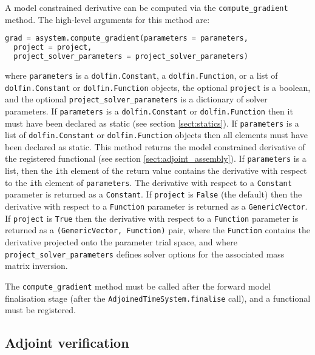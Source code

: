 \documentclass[a4paper]{book}
\begin{document}
A model constrained derivative can be computed via the \verb+compute_gradient+
method. The high-level arguments for this method are:
\begin{lstlisting}[language = python, frame = single, basicstyle=\footnotesize]
grad = asystem.compute_gradient(parameters = parameters,
  project = project,
  project_solver_parameters = project_solver_parameters)
\end{lstlisting}
where \verb+parameters+ is a \verb+dolfin.Constant+, a \verb+dolfin.Function+,
or a list of \verb+dolfin.Constant+ or \verb+dolfin.Function+ objects, the
optional \verb+project+ is a \linebreak boolean, and the optional
\verb+project_solver_parameters+ is a dictionary of solver parameters. If
\verb+parameters+ is a \verb+dolfin.Constant+ or \verb+dolfin.Function+ then it
must have been declared as static (see section \ref{sect:statics}). If
\verb+parameters+ is a list of \verb+dolfin.Constant+ or \verb+dolfin.Function+
objects then all elements must have been declared as static. This method returns
the model constrained derivative of the registered functional (see section
\ref{sect:adjoint_assembly}). If \verb+parameters+ is a list, then the
\verb+i+th element of the return value contains the derivative with respect to
the \verb+i+th element of \verb+parameters+. The derivative with respect to a
\verb+Constant+ parameter is returned as a \verb+Constant+. If \verb+project+ is
\verb+False+ (the default) then the derivative with respect to a \verb+Function+
parameter is returned as a \verb+GenericVector+. If \verb+project+ is
\verb+True+ then the derivative with respect to a \verb+Function+ parameter is
returned as a \verb+(GenericVector, Function)+ pair, where the \verb+Function+
contains the derivative projected onto the parameter trial space, and where
\verb+project_solver_parameters+ defines solver options for the associated mass
matrix inversion.

The \verb+compute_gradient+ method must be called after the forward model
finalisation stage (after the \verb+AdjoinedTimeSystem.finalise+ call), and a
functional must be registered.

\subsection{Adjoint verification}
\end{document}
